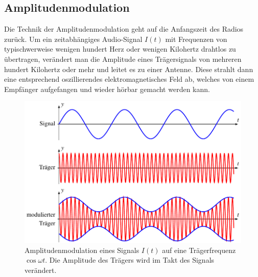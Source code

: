 %
%
%
\subsection{Amplitudenmodulation
\label{subsection:amplitudenmodulation}}
Die Technik der Amplitudenmodulation geht auf die Anfangszeit des
Radios zurück.
Um ein zeitabhängiges Audio-Signal $I(t)$ mit Frequenzen von typischwerweise
wenigen hundert Herz oder wenigen Kilohertz drahtlos zu übertragen,
verändert man die Amplitude eines Trägersignals von mehreren hundert
Kilohertz oder mehr und leitet es zu einer Antenne.
Diese strahlt dann eine entsprechend oszillierendes elektromagnetisches
Feld ab, welches von einem Empfänger aufgefangen und wieder hörbar gemacht
werden kann.

\begin{figure}
\centering
\includegraphics{applications/qam/am.pdf}
\caption{Amplitudenmodulation eines Signals $I(t)$ auf eine
Trägerfrequenz $\cos\omega t$.
Die Amplitude des Trägers wird im Takt des Signals verändert.
\label{figure:qam:am}}
\end{figure}

